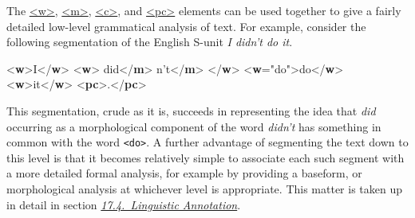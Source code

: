 The \hyperref[TEI.w]{<w>}, \hyperref[TEI.m]{<m>}, \hyperref[TEI.c]{<c>}, and \hyperref[TEI.pc]{<pc>} elements can be used together to give a fairly detailed low-level grammatical analysis of text. For example, consider the following segmentation of the English S-unit \textit{I didn't do it}. \par\bgroup{}\exampleFont \begin{shaded}\noindent\mbox{}{<\textbf{w}>}I{</\textbf{w}>}\mbox{}\newline 
{<\textbf{w}>}\mbox{}\newline 
{}did{</\textbf{m}>}\mbox{}\newline 
{}n't{</\textbf{m}>}\mbox{}\newline 
{</\textbf{w}>}\mbox{}\newline 
{<\textbf{w}\hspace*{1em}{lemma}="{do}">}do{</\textbf{w}>}\mbox{}\newline 
{<\textbf{w}>}it{</\textbf{w}>}\mbox{}\newline 
{<\textbf{pc}>}.{</\textbf{pc}>}\end{shaded}\egroup\par \noindent  \par
This segmentation, crude as it is, succeeds in representing the idea that \textit{did} occurring as a morphological component of the word \textit{didn't} has something in common with the word \texttt{<do>}. A further advantage of segmenting the text down to this level is that it becomes relatively simple to associate each such segment with a more detailed formal analysis, for example by providing a baseform, or morphological analysis at whichever level is appropriate. This matter is taken up in detail in section \textit{\hyperref[AILA]{17.4.\ Linguistic Annotation}}.
